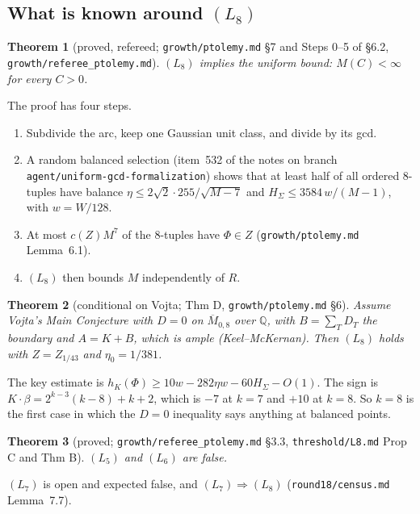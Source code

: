 \documentclass[11pt]{article}
\newtheorem{theorem}{Theorem}[section]
\newcommand{\Q}{\mathbb Q}
\newcommand{\Mbar}{\overline M_{0,8}}
\newcommand{\rec}[1]{\texttt{#1}}
\begin{document}
\subsection{What is known around \texorpdfstring{\((L_8)\)}{(L8)}}

\begin{theorem}[proved, refereed; \rec{growth/ptolemy.md} \S7 and Steps 0--5 of \S6.2, \rec{growth/referee\_ptolemy.md}]\label{thm:L8uniform}
\((L_8)\) implies the uniform bound: \(M(C)<\infty\) for every \(C>0\).
\end{theorem}

The proof has four steps.
\begin{enumerate}[leftmargin=2em]
  \item Subdivide the arc, keep one Gaussian unit class, and divide by its gcd.
  \item A random balanced selection (item~532 of the notes on branch
    \rec{agent/uniform-gcd-formalization}) shows that at least half of all
    ordered \(8\)-tuples have balance \(\eta\le2\sqrt2\cdot255/\sqrt{M-7}\) and
    \(H_\Sigma\le3584\,w/(M-1)\), with \(w=W/128\).
  \item At most \(c(Z)M^7\) of the \(8\)-tuples have \(\Phi\in Z\) (\rec{growth/ptolemy.md} Lemma~6.1).
  \item \((L_8)\) then bounds \(M\) independently of \(R\).
\end{enumerate}

\begin{theorem}[conditional on Vojta; Thm D, \rec{growth/ptolemy.md} \S6]\label{thm:VojtaL8}
Assume Vojta's Main Conjecture with \(D=0\) on \(\Mbar\) over \(\Q\), with
\(B=\sum_TD_T\) the boundary and \(A=K+B\), which is ample (Keel--McKernan).
Then \((L_8)\) holds with \(Z=Z_{1/43}\) and \(\eta_0=1/381\).
\end{theorem}

The key estimate is \(h_K(\Phi)\ge10w-282\eta w-60H_\Sigma-O(1)\).  The sign is
\(K\cdot\beta=2^{k-3}(k-8)+k+2\), which is \(-7\) at \(k=7\) and \(+10\) at
\(k=8\).  So \(k=8\) is the first case in which the \(D=0\) inequality says
anything at balanced points.

\begin{theorem}[proved; \rec{growth/referee\_ptolemy.md} \S3.3, \rec{threshold/L8.md} Prop C and Thm B]\label{thm:L56false}
\((L_5)\) and \((L_6)\) are false.
\end{theorem}

\((L_7)\) is open and expected false, and \((L_7)\Rightarrow(L_8)\)
(\rec{round18/census.md} Lemma~7.7).
\end{document}
